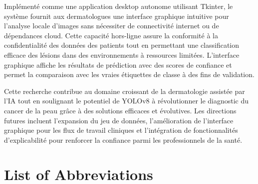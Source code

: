 \documentclass[a4paper,12pt]{report}
\begin{document}
\begin{spacing}{1.5}
    Implémenté comme une application desktop autonome utilisant Tkinter, le système fournit aux dermatologues une interface graphique intuitive pour l'analyse locale d'images sans nécessiter de connectivité internet ou de dépendances cloud. Cette capacité hors-ligne assure la conformité à la confidentialité des données des patients tout en permettant une classification efficace des lésions dans des environnements à ressources limitées. L'interface graphique affiche les résultats de prédiction avec des scores de confiance et permet la comparaison avec les vraies étiquettes de classe à des fins de validation.
    
    Cette recherche contribue au domaine croissant de la dermatologie assistée par l'IA tout en soulignant le potentiel de YOLOv8 à révolutionner le diagnostic du cancer de la peau grâce à des solutions efficaces et évolutives. Les directions futures incluent l'expansion du jeu de données, l'amélioration de l'interface graphique pour les flux de travail cliniques et l'intégration de fonctionnalités d'explicabilité pour renforcer la confiance parmi les professionnels de la santé.


\tableofcontents
\listoffigures
\listoftables
\listoflistings
{}

\chapter*{List of Abbreviations}


\end{spacing}
\end{document}

